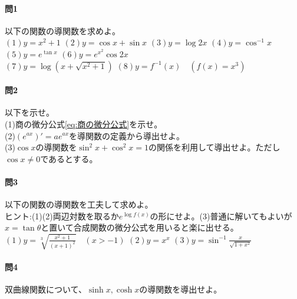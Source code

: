 \documentclass[a4j,dvipdfmx]{jsarticle}
\begin{document}
                \paragraph{問1}以下の関数の導関数を求めよ。\\
                $(1)y=x^2+1$\hspace{3mm}
                $(2)y=\cos x+\sin x$\hspace{3mm}
                $(3)y=\log 2x$\hspace{3mm}
                $(4)y=\cos^{-1}x$\hspace{3mm}
                $(5)y=e^{\tan x}$\hspace{3mm}
                $(6)y=e^{x^2}\cos 2x$\\
                $\displaystyle(7)y=\log(x+\sqrt{x^2+1})$\hspace{3mm}
                $(8)y=f^{-1}(x)\quad (f(x)=x^3)$

                \paragraph{問2}以下を示せ。\\
                (1)商の微分公式\eqref{eq:商の微分公式}を示せ。\\
                (2)$(e^{ax})'=ae^{ax}$を導関数の定義から導出せよ。\\
                (3)$\cos x$の導関数を$\sin^2 x+\cos ^2 x=1$の関係を利用して導出せよ。ただし$\cos x\neq 0$であるとする。

                \paragraph{問3}以下の関数の導関数を工夫して求めよ。\\{\scriptsize ヒント:(1)(2)両辺対数を取るか$e^{\log f(x)}$の形にせよ。(3)普通に解いてもよいが$x=\tan \theta$と置いて合成関数の微分公式を用いると楽に出せる。}\\
                $\displaystyle(1)y=\sqrt[3]{\frac{x^2+1}{(x+1)^2}}\quad(x>-1)$\hspace{3mm}
                $(2)y=x^x$\hspace{3mm}
                $\displaystyle(3)y=\sin^{-1}\frac{x}{\sqrt{1+x^2}}$

                \paragraph{問4}双曲線関数について、$\sinh x,\cosh x$の導関数を導出せよ。
\end{document}
